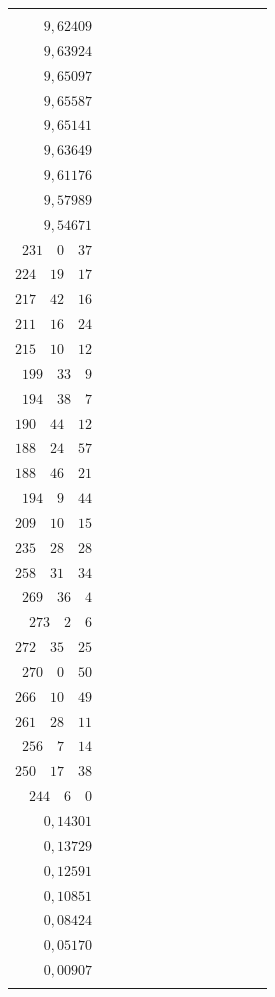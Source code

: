 \begin{landscape}
\begin{center}
\begin{tabular}{r|r|r|r|r|r|r|r|r|r|r|r|r}
{\(9{,}61129\) \\
\(9{,}62409\) \\[3pt]
\(9{,}63924\) \\
\(9{,}65097\) \\
\(9{,}65587\) \\
\(9{,}65141\) \\[3pt]
\(9{,}63649\) \\
\(9{,}61176\) \\
\(9{,}57989\) \\
\(9{,}54671\)
}
&
\GaussVIIcolumn{
\(237^0\quad 38'\quad 9''\) \\
\(231\quad 0\quad 37\) \\
\(224\quad 19\quad 17\) \\
\(217\quad 42\quad 16\) \\[3pt]
\(211\quad 16\quad 24\) \\
\(215\quad 10\quad 12\) \\
\(199\quad 33\quad 9\) \\
\(194\quad 38\quad 7\) \\[3pt]
\(190\quad 44\quad 12\) \\
\(188\quad 24\quad 57\) \\
\(188\quad 46\quad 21\) \\
\(194\quad 9\quad 44\) \\[3pt]
\(209\quad 10\quad 15\) \\
\(235\quad 28\quad 28\) \\
\(258\quad 31\quad 34\) \\
\(269\quad 36\quad 4\) \\[3pt]
\(273\quad 2\quad 6\) \\
\(272\quad 35\quad 25\) \\
\(270\quad 0\quad 50\) \\
\(266\quad 10\quad 49\) \\[3pt]
\(261\quad 28\quad 11\) \\
\(256\quad 7\quad 14\) \\
\(250\quad 17\quad 38\) \\
\(244\quad 6\quad 0\)
}
&
\GaussVIIcolumn{
\(0{,}14323\) \\
\(0{,}14301\) \\
\(0{,}13729\) \\
\(0{,}12591\) \\[3pt]
\(0{,}10851\) \\
\(0{,}08424\) \\
\(0{,}05170\) \\
\(0{,}00907\) \\[3pt]
}
\end{tabular}
\end{center}
\end{landscape}
